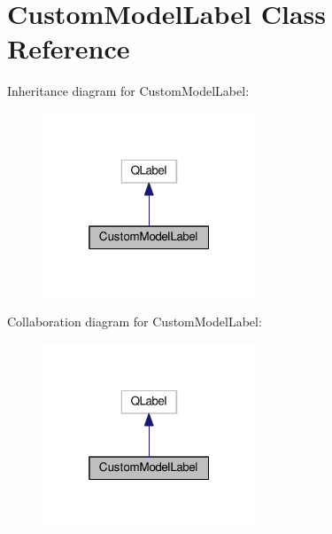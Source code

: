 \hypertarget{class_custom_model_label}{}\section{Custom\+Model\+Label Class Reference}
\label{class_custom_model_label}


Inheritance diagram for Custom\+Model\+Label\+:
\nopagebreak
\begin{figure}[H]
\begin{center}
\leavevmode
\includegraphics[width=181pt]{class_custom_model_label__inherit__graph}
\end{center}
\end{figure}


Collaboration diagram for Custom\+Model\+Label\+:
\nopagebreak
\begin{figure}[H]
\begin{center}
\leavevmode
\includegraphics[width=181pt]{class_custom_model_label__coll__graph}
\end{center}
\end{figure}
